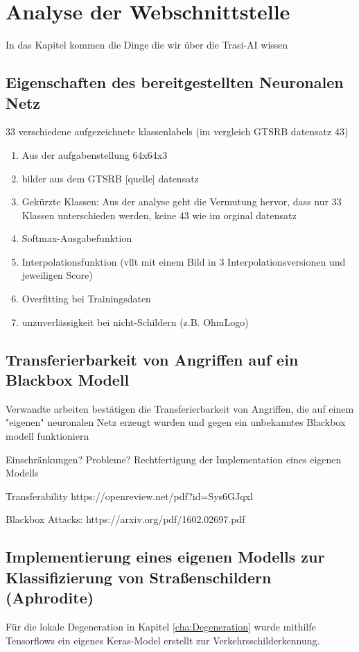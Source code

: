 \chapter{Analyse der Webschnittstelle}
\label{cha:TrasiAnalyse}
In das Kapitel kommen die Dinge die wir über die Trasi-AI wissen
\section{Eigenschaften des bereitgestellten Neuronalen Netz}
\label{sec:TrainingsDaten}




33 verschiedene aufgezeichnete klassenlabels (im vergleich GTSRB datensatz 43)

\begin{enumerate}
	\item 
	Aus der aufgabenstellung 64x64x3
	\item 
	bilder aus dem GTSRB [quelle] datensatz
	\item Gekürzte Klassen: Aus der analyse geht die Vermutung hervor, dass nur 33 Klassen unterschieden werden, keine 43 wie im orginal datensatz
	\item Softmax-Ausgabefunktion 
	\item Interpolationsfunktion (vllt mit einem Bild in 3 Interpolationsversionen und jeweiligen Score) 
	\item Overfitting bei Trainingsdaten
	\item unzuverlässigkeit bei nicht-Schildern (z.B. OhmLogo)
\end{enumerate}

\section{Transferierbarkeit von Angriffen auf ein Blackbox Modell}
\label{sec:TrasiModell}
Verwandte arbeiten bestätigen  die Transferierbarkeit von Angriffen, die auf einem "eigenen" neuronalen Netz erzeugt wurden und gegen ein unbekanntes Blackbox modell funktioniern

Einschränkungen? Probleme? Rechtfertigung der Implementation eines eigenen Modells

Transferability https://openreview.net/pdf?id=Sys6GJqxl


Blackbox Attacks: https://arxiv.org/pdf/1602.02697.pdf

\section{Implementierung eines eigenen Modells zur Klassifizierung von Straßenschildern (Aphrodite)}
Für die lokale Degeneration in Kapitel \ref{cha:Degeneration} wurde mithilfe Tensorflows ein eigenes Keras-Model erstellt zur Verkehrsschilderkennung. 

